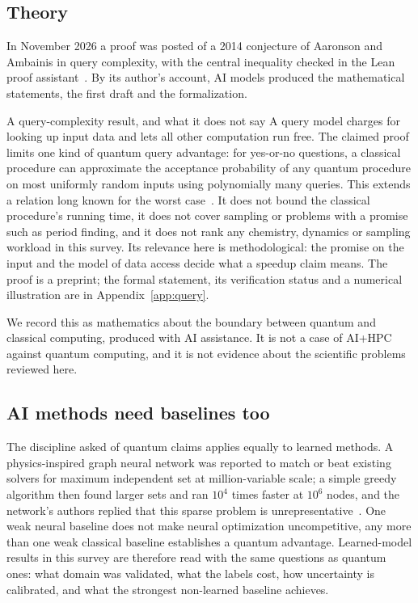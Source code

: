 \subsection{Theory}
In November 2026 a proof was posted of a 2014 conjecture of Aaronson and Ambainis in query complexity, with the central inequality checked in the Lean proof assistant~\cite{aa2014,turturean2026}. By its author's account, AI models produced the mathematical statements, the first draft and the formalization.

\begin{rulebox}{A query-complexity result, and what it does not say}
A query model charges for looking up input data and lets all other computation run free. The claimed proof limits one kind of quantum query advantage: for yes-or-no questions, a classical procedure can approximate the acceptance probability of any quantum procedure on most uniformly random inputs using polynomially many queries. This extends a relation long known for the worst case~\cite{beals2001,abkrt2021}. It does not bound the classical procedure's running time, it does not cover sampling or problems with a promise such as period finding, and it does not rank any chemistry, dynamics or sampling workload in this survey. Its relevance here is methodological: the promise on the input and the model of data access decide what a speedup claim means. The proof is a preprint; the formal statement, its verification status and a numerical illustration are in Appendix~\ref{app:query}.
\end{rulebox}

We record this as mathematics about the boundary between quantum and classical computing, produced with AI assistance. It is not a case of AI+HPC against quantum computing, and it is not evidence about the scientific problems reviewed here.

\subsection{AI methods need baselines too}
The discipline asked of quantum claims applies equally to learned methods. A physics-inspired graph neural network was reported to match or beat existing solvers for maximum independent set at million-variable scale; a simple greedy algorithm then found larger sets and ran $10^4$ times faster at $10^6$ nodes, and the network's authors replied that this sparse problem is unrepresentative~\cite{angelini2022,schuetz2023}. One weak neural baseline does not make neural optimization uncompetitive, any more than one weak classical baseline establishes a quantum advantage. Learned-model results in this survey are therefore read with the same questions as quantum ones: what domain was validated, what the labels cost, how uncertainty is calibrated, and what the strongest non-learned baseline achieves.
